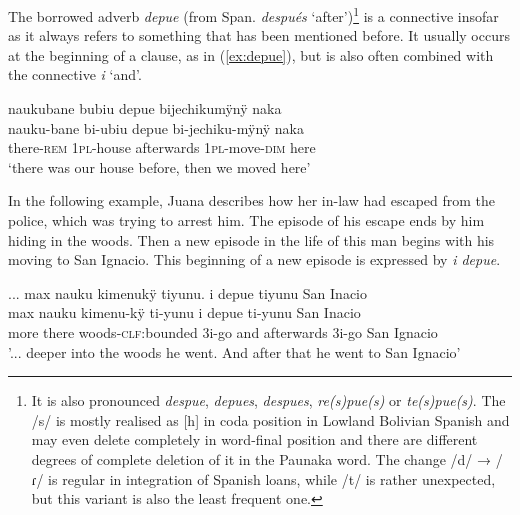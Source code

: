 The borrowed adverb \textit{depue} (from Span. \textit{después} ‘after’)\footnote{It is also pronounced \textit{despue}, \textit{depues}, \textit{despues}, \textit{re(s)pue(s)} or \textit{te(s)pue(s)}. The /s/ is mostly realised as [h] in coda position in Lowland Bolivian Spanish and may even delete completely in word-final position \citep[35]{Mendoza2015} and there are different degrees of complete deletion of it in the Paunaka word. The change /d/ → /ɾ/ is regular in integration of Spanish loans, while /t/ is rather unexpected, but this variant is also the least frequent one.} is a connective insofar as it always refers to something that has been mentioned before. It usually occurs at the beginning of a clause, as in (\ref{ex:depue}), but is also often combined with the connective \textit{i} ‘and’.

\ea\label{ex:depue}
\begingl
\glpreamble naukubane bubiu depue bijechikumÿnÿ naka\\
\gla nauku-bane bi-ubiu depue bi-jechiku-mÿnÿ naka\\
\glb there-\textsc{rem} 1\textsc{pl}-house afterwards 1\textsc{pl}-move-\textsc{dim} here\\
\glft ‘there was our house before, then we moved here’
\endgl
\trailingcitation{[rxx-e120511l.168]}
\xe

In the following example, Juana describes how her in-law had escaped from the police, which was trying to arrest him. The episode of his escape ends by him hiding in the woods. Then a new episode in the life of this man begins with his moving to San Ignacio. This beginning of a new episode is expressed by \textit{i depue}.

\ea\label{ex:depue-2}
\begingl
\glpreamble ... max nauku kimenukÿ tiyunu. i depue tiyunu San Inacio\\
\gla max nauku kimenu-kÿ ti-yunu i depue ti-yunu {San Inacio}\\
\glb more there woods-\textsc{clf:}bounded 3i-go and afterwards 3i-go {San Ignacio}\\
\glft '... deeper into the woods he went. And after that he went to San Ignacio’
\endgl
\trailingcitation{[jxx-p120430l-2.056-058]}
\xe


